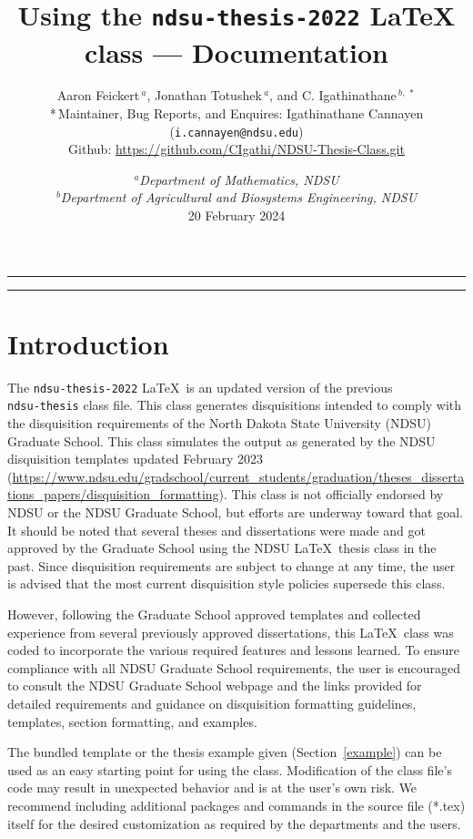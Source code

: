 \documentclass[letterpaper]{refart}
\title{Using the \texttt{ndsu-thesis-2022} \LaTeX\/ class --- Documentation}
\author{Aaron Feickert$\,^{a}$, Jonathan Totushek$\,^{a}$, and C. Igathinathane$\,^{b,\,*}$ \\ *\,Maintainer, Bug Reports, and Enquires:  Igathinathane Cannayen (\texttt{i.cannayen@ndsu.edu})\\ {\small Github: \url{https://github.com/CIgathi/NDSU-Thesis-Class.git}}
}
\date{{\small $^{a}$\emph{Department of Mathematics, NDSU} \\ $^{b}$\emph{Department of Agricultural and Biosystems Engineering, NDSU}\\[2ex]}
20 February 2024}
\newcommand\ix[1]{#1\index{#1}} %
\begin{document}
\maketitle

\hrule

\begin{fullpage}
\begin{multicols}{2}
\tableofcontents
\nopagebreak
\end{multicols}
\hrule
\end{fullpage}

\section{Introduction}
The \texttt{ndsu-thesis-2022} \LaTeX\ is an updated version of the previous \\\texttt{ndsu-thesis} \ix{class} file. This class generates disquisitions intended to comply with the disquisition requirements of the North Dakota State University (NDSU) Graduate School. This class simulates the output as generated by the NDSU disquisition templates updated February 2023 
(\url{https://www.ndsu.edu/gradschool/current_students/graduation/theses_dissertations_papers/disquisition_formatting}). This class is not officially endorsed by NDSU or the NDSU Graduate School, but efforts are underway toward that goal. It should be noted that several theses and dissertations were made and got approved by the Graduate School using the NDSU \LaTeX\ thesis class in the past. Since disquisition requirements are subject to change at any time, the user is advised that the most current disquisition style policies supersede this class. 

However, following the Graduate School approved templates and collected experience from several previously approved dissertations, this \LaTeX\ class was coded to incorporate the various required features and lessons learned. To ensure compliance with all NDSU Graduate School requirements, the user is encouraged to consult the NDSU Graduate School webpage and the links provided for detailed requirements and guidance on disquisition formatting guidelines, templates, section formatting, and examples.

The bundled \ix{template} or the thesis example given (Section~\ref{example}) can be used as an easy starting point for using the class. Modification of the class file's code may result in unexpected behavior and is at the user's own risk. We recommend including additional packages and commands in the source file (*.tex) itself for the desired customization as required by the departments and the users. 
\end{document}
